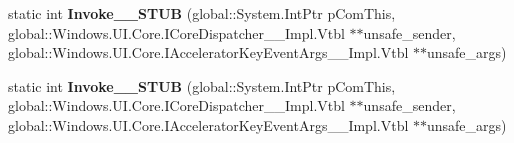 \begin{DoxyCompactItemize}
static int {\bfseries Invoke\+\_\+\+\_\+\+S\+T\+UB} (global\+::\+System.\+Int\+Ptr p\+Com\+This, global\+::\+Windows.\+U\+I.\+Core.\+I\+Core\+Dispatcher\+\_\+\+\_\+\+Impl.\+Vtbl $\ast$$\ast$unsafe\+\_\+sender, global\+::\+Windows.\+U\+I.\+Core.\+I\+Accelerator\+Key\+Event\+Args\+\_\+\+\_\+\+Impl.\+Vtbl $\ast$$\ast$unsafe\+\_\+args)
\item 
\mbox{\label{struct_windows_1_1_foundation_1_1_typed_event_handler___a___windows___u_i___core___core_dispatch3f137e4e492cef082f78b8aa53fc2fe8_ad90c048c000049f02ad4245d52448f0d}} 
static int {\bfseries Invoke\+\_\+\+\_\+\+S\+T\+UB} (global\+::\+System.\+Int\+Ptr p\+Com\+This, global\+::\+Windows.\+U\+I.\+Core.\+I\+Core\+Dispatcher\+\_\+\+\_\+\+Impl.\+Vtbl $\ast$$\ast$unsafe\+\_\+sender, global\+::\+Windows.\+U\+I.\+Core.\+I\+Accelerator\+Key\+Event\+Args\+\_\+\+\_\+\+Impl.\+Vtbl $\ast$$\ast$unsafe\+\_\+args)
\end{DoxyCompactItemize}
